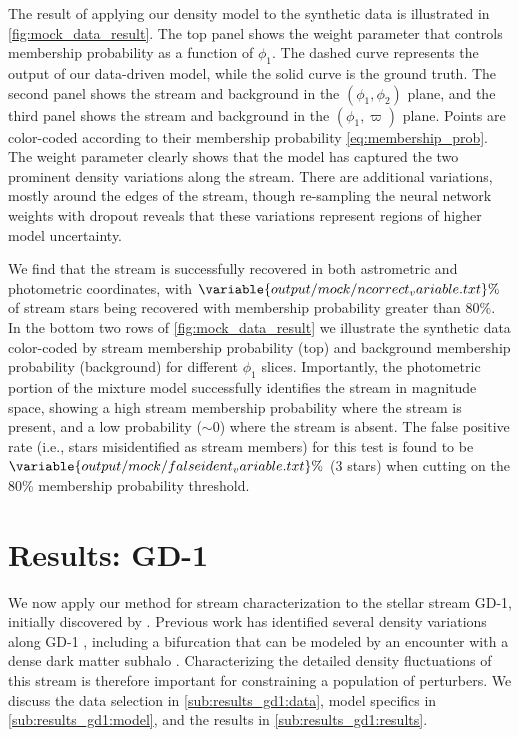 \documentclass[twocolumn]{aastex631}
\newcommand{\stream}[1]{#1}
\newcommand{\parallax}{\varpi}
\begin{document}
        The result of applying our density model to the synthetic data is
        illustrated in \autoref{fig:mock_data_result}. The top panel shows the
        weight parameter that controls membership probability as a function of
        $\phi_1$. The dashed curve represents the output of our data-driven
        model, while the solid curve is the ground truth. The second panel shows
        the stream and background in the $(\phi_1,\phi_2)$ plane, and the third
        panel shows the stream and background in the $(\phi_1,\parallax)$ plane.
        Points are color-coded according to their membership probability
        \autoref{eq:membership_prob}. The weight parameter clearly shows that
        the model has captured the two prominent density variations along the
        stream.  There are additional variations, mostly around the edges of the
        stream, though re-sampling the neural network weights with dropout
        reveals that these variations represent regions of higher model
        uncertainty. 

        We find that the stream is successfully recovered in both astrometric
        and photometric coordinates, with
        $\variable{output/mock/ncorrect_variable.txt}\%$ of stream stars being
        recovered with membership probability greater than $80\%$.  In the
        bottom two rows of \autoref{fig:mock_data_result} we illustrate the
        synthetic data color-coded by stream membership probability (top) and
        background membership probability (background) for different $\phi_1$
        slices. Importantly, the photometric portion of the mixture model
        successfully identifies the stream in magnitude space, showing a high
        stream membership probability where the stream is present, and a low
        probability ($\sim 0$) where the stream is absent.  The false positive
        rate (i.e., stars misidentified as stream members) for this test is
        found to be $\variable{output/mock/falseident_variable.txt}\%$ (3 stars)
        when cutting on the 80\% membership probability threshold.



\section{Results: GD-1} \label{sec:results_gd1}

    We now apply our method for stream characterization to the stellar stream
    \stream{GD-1}, initially discovered by \citet{GrillmairDionatos2006}.
    Previous work has identified several density variations along \stream{GD-1}
    \citep{deBoer+2018}, including a bifurcation that can be modeled by an
    encounter with a dense dark matter subhalo \citep{Bonaca+2019, Webb+2019}.
    Characterizing the detailed density fluctuations of this stream is therefore
    important for constraining a population of perturbers.  We discuss the data
    selection in \autoref{sub:results_gd1:data}, model specifics in
    \autoref{sub:results_gd1:model}, and the results in
    \autoref{sub:results_gd1:results}.
\end{document}
